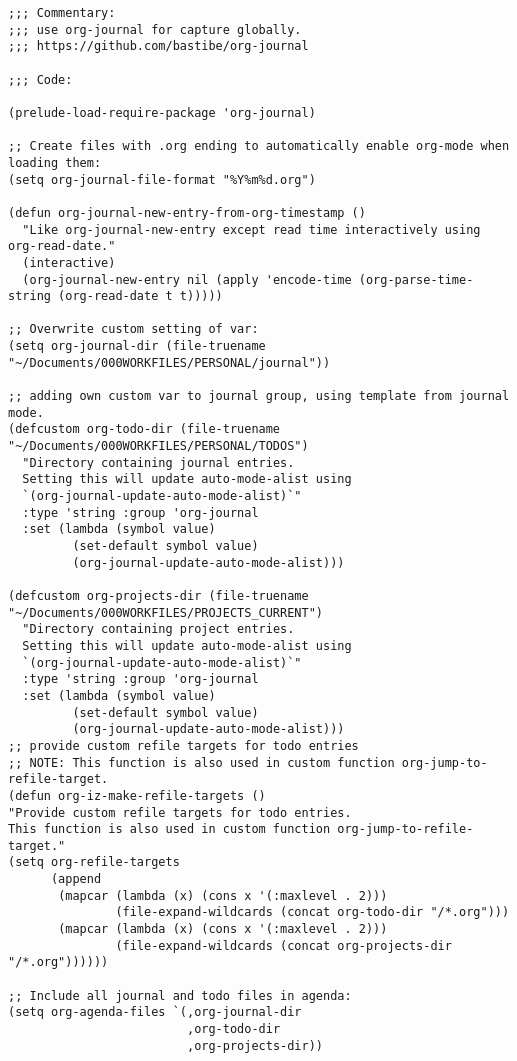 \documentclass[11pt]{article}
\begin{document}
\begin{verbatim}
;;; Commentary:
;;; use org-journal for capture globally.
;;; https://github.com/bastibe/org-journal

;;; Code:

(prelude-load-require-package 'org-journal)

;; Create files with .org ending to automatically enable org-mode when loading them:
(setq org-journal-file-format "%Y%m%d.org")

(defun org-journal-new-entry-from-org-timestamp ()
  "Like org-journal-new-entry except read time interactively using org-read-date."
  (interactive)
  (org-journal-new-entry nil (apply 'encode-time (org-parse-time-string (org-read-date t t)))))

;; Overwrite custom setting of var:
(setq org-journal-dir (file-truename "~/Documents/000WORKFILES/PERSONAL/journal"))

;; adding own custom var to journal group, using template from journal mode.
(defcustom org-todo-dir (file-truename "~/Documents/000WORKFILES/PERSONAL/TODOS")
  "Directory containing journal entries.
  Setting this will update auto-mode-alist using
  `(org-journal-update-auto-mode-alist)`"
  :type 'string :group 'org-journal
  :set (lambda (symbol value)
         (set-default symbol value)
         (org-journal-update-auto-mode-alist)))

(defcustom org-projects-dir (file-truename "~/Documents/000WORKFILES/PROJECTS_CURRENT")
  "Directory containing project entries.
  Setting this will update auto-mode-alist using
  `(org-journal-update-auto-mode-alist)`"
  :type 'string :group 'org-journal
  :set (lambda (symbol value)
         (set-default symbol value)
         (org-journal-update-auto-mode-alist)))
;; provide custom refile targets for todo entries
;; NOTE: This function is also used in custom function org-jump-to-refile-target.
(defun org-iz-make-refile-targets ()
"Provide custom refile targets for todo entries.
This function is also used in custom function org-jump-to-refile-target."
(setq org-refile-targets
      (append
       (mapcar (lambda (x) (cons x '(:maxlevel . 2)))
               (file-expand-wildcards (concat org-todo-dir "/*.org")))
       (mapcar (lambda (x) (cons x '(:maxlevel . 2)))
               (file-expand-wildcards (concat org-projects-dir "/*.org"))))))

;; Include all journal and todo files in agenda:
(setq org-agenda-files `(,org-journal-dir
                         ,org-todo-dir
                         ,org-projects-dir))


\end{verbatim}
\end{document}

